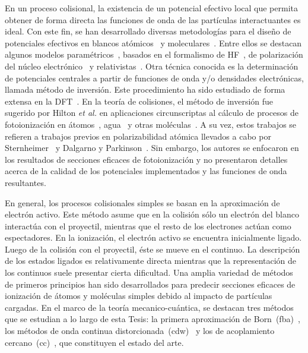 En un proceso colisional, la existencia de un potencial efectivo local 
que permita obtener de forma directa las funciones de onda de las 
partículas interactuantes es ideal. Con este fin, se han desarrollado 
diversas metodologías para el diseño de potenciales efectivos en blancos 
atómicos~\cite{Hibbert:82} y moleculares~\cite{Menchero:10,Granados:16}. 
Entre ellos se destacan algunos modelos 
paramétricos~\cite{Gombas:56,Green:69,Klapisch:71}, basados en el 
formalismo de HF~\cite{Phillips:59,Herman:63}, de polarización del 
núcleo electrónico~\cite{Dalgarno:70,Bayliss:77} y 
relativistas~\cite{Cowan:76,Lee:77}. Otra técnica conocida es la 
determinación de potenciales centrales a partir de funciones de onda y/o 
densidades electrónicas, llamada método de inversión. Este procedimiento 
ha sido estudiado de forma extensa en la DFT~\cite{Wu:03,Gaiduk:13,
Ryabinkin:15,Schipper:97,deSilva:12,Kananenka:13,Mura:97,Jacob:11}. En 
la teoría de colisiones, el método de inversión fue sugerido por Hilton 
\textit{et al.} en aplicaciones circunscriptas al cálculo de procesos de 
fotoionización en átomos~\cite{Hilton:77,Suzer:77}, agua~\cite{Hilton:79} 
y otras moléculas~\cite{Hilton:80,Crljen:87}. A su vez, estos trabajos 
se refieren a trabajos previos en polarizabilidad atómica llevados a 
cabo por Sternheimer~\cite{Sternheimer:54} y Dalgarno y 
Parkinson~\cite{Dalgarno:59}. Sin embargo, los autores se enfocaron en 
los resultados de secciones eficaces de fotoionización y no presentaron 
detalles acerca de la calidad de los potenciales implementados y las 
funciones de onda resultantes. 

En general, los procesos colisionales simples se basan en la 
aproximación de electrón activo. Este método asume que en la colisión 
sólo un electrón del blanco interactúa con el proyectil, mientras que el 
resto de los electrones actúan como espectadores. En la ionización, el 
electrón activo se encuentra inicialmente ligado. Luego de la colisión 
con el proyectil, éste se mueve en el continuo. La descripción de los 
estados ligados es relativamente directa mientras que la representación 
de los continuos suele presentar cierta dificultad. Una amplia variedad 
de métodos de primeros principios han sido desarrollados para predecir 
secciones eficaces de ionización de átomos y moléculas simples debido al 
impacto de partículas cargadas. En el marco de la teoría 
mecanico-cuántica, se destacan tres métodos que se estudian a lo largo 
de esta Tesis: la primera aproximación de 
Born~(\acs{fba})~\cite{Bates:62,McDowell:61}, los métodos de onda 
continua distorcionada~(\acs{cdw})~\cite{Crothers:10,Rivarola:87} y los 
de acoplamiento cercano~(\acs{cc})~\cite{Pindzola:07,Burke:11,
Pindzola:16,Bray:17}, que constituyen el estado del arte.

